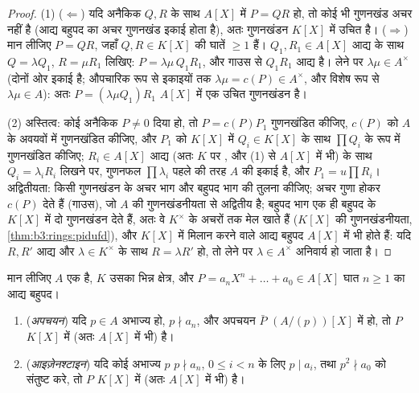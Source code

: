 \begin{proof}
(1) ($\Leftarrow$) यदि अनैकिक $Q, R$ के साथ $A[X]$ में $P = QR$ हो, तो कोई
भी गुणनखंड अचर नहीं है (आद्य बहुपद का अचर गुणनखंड इकाई होता है),
अतः गुणनखंडन $K[X]$ में उचित है।
($\Rightarrow$) मान लीजिए $P = QR$, जहाँ $Q, R \in K[X]$ की घातें $\geq 1$ हैं। $Q_1, R_1
\in A[X]$
आद्य के साथ $Q = \lambda Q_1$, $R = \mu R_1$ लिखिए: $P = \lambda\mu\, Q_1R_1$, और गाउस से $Q_1R_1$ आद्य है।
 लेने पर $\lambda\mu \in A^\times$ (दोनों ओर इकाई  है; औपचारिक
रूप से इकाइयों तक $\lambda\mu = c(P) \in
A^\times$, और विशेष रूप से $\lambda \mu \in A$): अतः $P
= (\lambda\mu Q_1) R_1$
$A[X]$ में एक उचित गुणनखंडन है।

(2) अस्तित्व: कोई अनैकिक $P \neq 0$ दिया हो, तो $P = c(P)P_1$ गुणनखंडित
कीजिए, $c(P)$ को $A$ के  अवयवों में गुणनखंडित कीजिए, और
$P_1$ को  $K[X]$ में $Q_i \in K[X]$  के साथ $\prod Q_i$ के रूप में
गुणनखंडित कीजिए; $R_i \in A[X]$ आद्य (अतः $K$ पर , और (1) से
$A[X]$ में भी) के साथ $Q_i = \lambda_i R_i$ लिखने पर, गुणनफल $\prod \lambda_i$ पहले की तरह
$A$ की इकाई है, और $P_1 = u\prod
R_i$। अद्वितीयता: किसी गुणनखंडन के अचर भाग
और बहुपद भाग की तुलना कीजिए; अचर गुणा होकर $c(P)$ देते हैं (गाउस),
जो $A$ की गुणनखंडनीयता से अद्वितीय है; बहुपद भाग एक ही बहुपद
के $K[X]$ में दो गुणनखंडन देते हैं, अतः वे $K^\times$ के अचरों तक मेल
खाते हैं ($K[X]$ की गुणनखंडनीयता, \cref{thm:b3:rings:pidufd}), और $K[X]$ में 
मिलान करने वाले आद्य बहुपद $A[X]$ में भी  होते हैं: यदि
$R, R'$ आद्य और $\lambda \in K^\times$ के साथ $R = \lambda R'$ हो, तो  लेने पर
$\lambda \in A^\times$ अनिवार्य हो जाता है।
\end{proof}

\begin{theorem}[अखंडनीयता की कसौटियाँ]\label{thm:b3:rings:criteria}
मान लीजिए $A$ एक  है, $K$ उसका भिन्न क्षेत्र, और $P = a_nX^n + \dots
+ a_0 \in A[X]$
घात $n \geq 1$ का आद्य बहुपद।
\begin{enumerate}
  \item (\emph{अपचयन}) यदि $p \in A$ अभाज्य हो, $p \nmid a_n$, और अपचयन
        $\bar P$ $(A/(p))[X]$ में  हो, तो $P$ $K[X]$ में (अतः
        $A[X]$ में भी)  है।
  \item (\emph{आइज़ेनश्टाइन}) यदि कोई
        अभाज्य $p$ $p \nmid a_n$, $0
        \leq i < n$ के लिए $p \mid a_i$, तथा $p^2 \nmid a_0$ को
        संतुष्ट करे, तो $P$ $K[X]$ में (अतः $A[X]$ में भी)
         है।
\end{enumerate}
\end{theorem}

